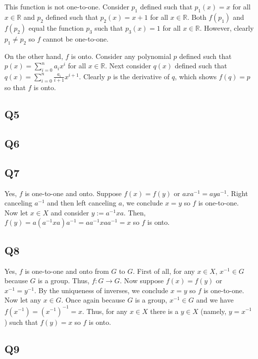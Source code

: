 \documentclass[12pt]{article}
\def\R{{\mathbb R}}        %
\numberwithin{theorem}{section}
\numberwithin{equation}{section}
\numberwithin{remark}{section}
\numberwithin{definition}{section}
\numberwithin{theorem}{section}
\numberwithin{lemma}{section}
\numberwithin{example}{section}
\begin{document}
This function is not one-to-one. Consider $p_1$ defined such that $p_1(x)=x$ for all $x\in\R$ and $p_2$ defined such that $p_2(x)=x+1$ for all $x\in\R$. Both $f(p_1)$ and $f(p_2)$ equal the function $p_3$ such that $p_3(x)=1$ for all $x\in\R$. However, clearly $p_1\neq p_2$ so $f$ cannot be one-to-one.

On the other hand, $f$ is onto. Consider any polynomial $p$ defined such that $p(x)=\sum_{i=0}^na_ix^i$ for all $x\in\R$. Next consider $q(x)$ defined such that $q(x)=\sum_{i=0}^n\frac{a_i}{i+1}x^{i+1}$. Clearly $p$ is the derivative of $q$, which shows $f(q)=p$ so that $f$ is onto. 



\subsection{Q5}

\subsection{Q6}

\subsection{Q7}

Yes, $f$ is one-to-one and onto. Suppose $f(x)=f(y)$ or $axa^{-1}=aya^{-1}$. Right canceling $a^{-1}$ and then left canceling $a$, we conclude $x=y$ so $f$ is one-to-one. Now let $x\in X$ and consider $y:=a^{-1}xa$. Then, $f(y)=a\left(a^{-1}xa\right)a^{-1}=aa^{-1}xaa^{-1}=x$ so $f$ is onto. 



\subsection{Q8}

Yes, $f$ is one-to-one and onto from $G$ to $G$. First of all, for any $x\in X$, $x^{-1}\in G$ because $G$ is a group. Thus, $f:G\rightarrow G$. Now suppose $f(x)=f(y)$ or $x^{-1}=y^{-1}$. By the uniqueness of inverses, we conclude $x=y$ so $f$ is one-to-one. Now let any $x\in G$. Once again because $G$ is a group, $x^{-1}\in G$ and we have $f(x^{-1})=\left(x^{-1}\right)^{-1}=x$. Thus, for any $x\in X$ there is a $y\in X$ (namely, $y=x^{-1}$) such that $f(y)=x$ so $f$ is onto. 



\subsection{Q9}
\end{document}
